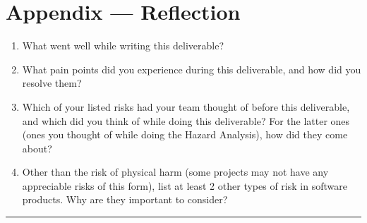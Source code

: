 \documentclass{article}
\begin{document}
\newpage{}

\section{Appendix --- Reflection}



\begin{enumerate}
    \item What went well while writing this deliverable?
    \item What pain points did you experience during this deliverable, and how
    did you resolve them?
    \item Which of your listed risks had your team thought of before this
    deliverable, and which did you think of while doing this deliverable? For
    the latter ones (ones you thought of while doing the Hazard Analysis), how
    did they come about?
    \item Other than the risk of physical harm (some projects may not have any
    appreciable risks of this form), list at least 2 other types of risk in
    software products. Why are they important to consider?
\end{enumerate}
\noindent\rule{\linewidth}{0.4pt}
\end{document}
